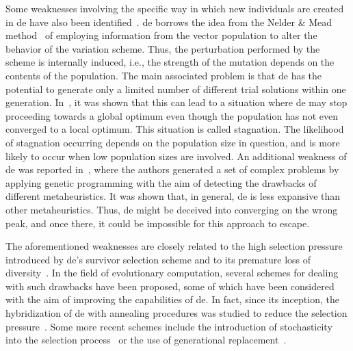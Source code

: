 \documentclass[review,3p]{elsarticle}
\newcommand{\DE}{{\sc de}}
\begin{document}
Some weaknesses involving the specific way in which new individuals are created in \DE{} have also been identified~\cite{Lampinen:00,Langdon:07}.
%
\DE{} borrows the idea from the Nelder \& Mead method~\cite{Nelder:65} of employing information from the vector population
to alter the behavior of the variation scheme.
%
Thus, the perturbation performed by the scheme is internally induced, i.e., the strength of the mutation depends on the contents of the population.
%
The main associated problem is that \DE{} has the potential to generate only a limited number of different trial solutions within one generation.
%
In~\cite{Lampinen:00}, it was shown that this can lead to a situation where \DE{} may stop proceeding towards a global optimum even though the population
has not even converged to a local optimum.
%
This situation is called stagnation.
%
The likelihood of stagnation occurring depends on the population size in question, and is more likely to occur
when low population sizes are involved.
%
%
%
%
An additional weakness of \DE{} was reported in~\cite{Langdon:07}, where the authors generated a set of complex problems by applying
genetic programming with the aim of detecting the drawbacks of different metaheuristics.
%
It was shown that, in general, \DE{} is less expansive than other metaheuristics.
%
Thus, \DE{} might be deceived into converging on the wrong peak, and once there, it could be impossible for this approach to escape.

The aforementioned weaknesses are closely related to the high selection pressure introduced by \DE{}'s survivor selection scheme
and to its premature loss of diversity~\cite{Angela:08}.
%
In the field of evolutionary computation, several schemes for dealing with such drawbacks have been proposed,
some of which have been considered with the aim of improving the capabilities of \DE{}.
%
In fact, since its inception, the hybridization of \DE{} with annealing procedures was studied to reduce the selection pressure~\cite{Price:05}.
%
Some more recent schemes include the introduction of stochasticity into the selection process~\cite{Angela:08}
or the use of generational replacement~\cite{Arabas:11}.
%
%
%
%
\end{document}
